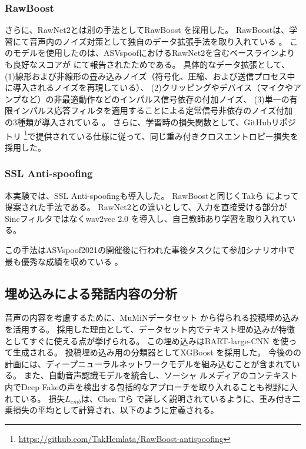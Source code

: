 \subsubsection{RawBoost}
さらに、RawNet2とは別の手法としてRawBoost \cite{9746213}を採用した。
RawBoostは、学習にて音声内のノイズ対策として独自のデータ拡張手法を取り入れている \cite{9746213}。
このモデルを使用したのは、ASVspoofにおけるRawNet2を含むベースラインよりも良好なスコアが \cite{9746213}にて報告されたためである。
具体的なデータ拡張として、
(1)線形および非線形の畳み込みノイズ（符号化、圧縮、および送信プロセス中に導入されるノイズを再現している）、
(2)クリッピングやデバイス（マイクやアンプなど）の非最適動作などのインパルス信号依存の付加ノイズ、
(3)単一の有限インパルス応答フィルタを適用することによる定常信号非依存のノイズ付加
の3種類が導入されている \cite{9746213}。
さらに、学習時の損失関数として、GitHubリポジトリ \footnote{\url{https://github.com/TakHemlata/RawBoost-antispoofing}}で提供されている仕様に従って、同じ重み付きクロスエントロピー損失を採用した。

\subsubsection{SSL Anti-spoofing}
本実験では、SSL Anti-spoofingも導入した。
RawBoostと同じくTakら \cite{tak2022automatic}によって提案された手法である。
RawNet2との違いとして、入力を直接受ける部分がSincフィルタではなくwav2vec 2.0 \cite{NEURIPS2020_92d1e1eb}を導入し、自己教師あり学習を取り入れている。

この手法はASVspoof2021の開催後に行われた事後タスクにて参加シナリオ中で最も優秀な成績を収めている \cite{10155166}。

\subsection{埋め込みによる発話内容の分析}
音声の内容を考慮するために、MuMiNデータセット \cite{10.1145/3477495.3531744,NielsenMcConville2022}から得られる投稿埋め込みを活用する。
採用した理由として、データセット内でテキスト埋め込みが特徴としてすぐに使える点が挙げられる。
この埋め込みはBART-large-CNN \cite{lewis-etal-2020-bart}を使って生成される。
投稿埋め込み用の分類器としてXGBoost \cite{10.1145/2939672.2939785}を採用した。
今後のの計画には、ディープニューラルネットワークモデルを組み込むことが含まれている。
また、自動音声認識モデルを統合し、ソーシャ ルメディアのコンテキスト内でDeep Fakeの声を検出する包括的なアプローチを取り入れることも視野に入れている。
損失$L_{emb}$は、Chen Tら \cite{10.1145/2939672.2939785}で詳しく説明されているように、重み付き二乗損失の平均として計算され、以下のように定義される。

